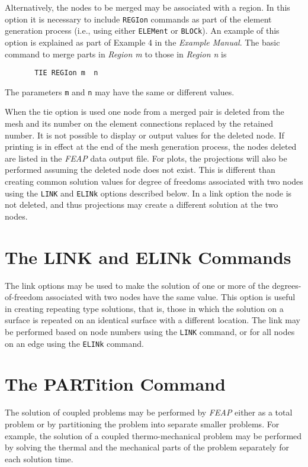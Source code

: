 Alternatively, the nodes to be merged may be associated with a region.  In
this option it is necessary to include {\tt REGIon} commands as part of the
element generation process (i.e., using either {\tt ELEMent} or {\tt BLOCk}).
An example of this option is explained as part of Example 4 in
the {\sl Example Manual}.
The basic command to merge parts in {\it Region m} to those in {\it Region n}
is
\begin{verbatim}
       TIE REGIon m  n
\end{verbatim}
The parameters {\tt m} and {\tt n} may have the same or different values.

When the tie option is used one node from a merged pair is deleted from
the mesh and its number on the element connections replaced by the retained
number.  It is not possible to display or output values for the
deleted node.  If printing is in effect at the end of the mesh
generation process, the nodes deleted are listed in the {\sl FEAP} data output
file.  For plots, the projections will also be performed assuming the deleted
node does not exist.
This is different than creating common solution
values for degree of freedoms associated with two nodes
using the {\tt LINK} and {\tt ELINk} options described below.  In a link
option the node is not deleted, and thus projections may create a
different solution at the two nodes.

\section{The LINK and ELINk Commands}
\label{link}

The link options may be used to make the solution of one or more of
the degrees-of-freedom associated with two nodes have the same value.
This option is useful in creating repeating type solutions, that is, those
in which the solution on a surface is repeated on an identical surface
with a different location.
The link may be performed based on node numbers using the {\tt LINK}
command, or for all nodes on an edge using the {\tt ELINk} command.

\section{The PARTition Command}
\label{part}

The solution of coupled problems may be performed by {\sl FEAP} either
as a total problem or by partitioning the problem into separate smaller
problems.  For example, the solution of a coupled thermo-mechanical problem
may be performed by solving the thermal and the mechanical parts of the
problem separately for each solution time.

